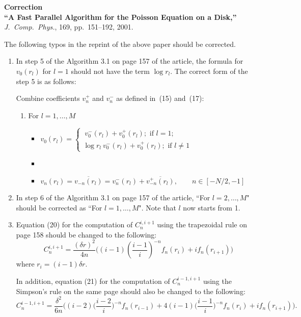 \documentclass[12pt]{article}
\begin{document}
\begin{center}
{\bf Correction}\\
{\bf ``A Fast Parallel Algorithm for the Poisson Equation on a Disk,''}
{\it J.\ Comp.\ Phys.\/}, 169, pp.~151--192, 2001.
\end{center}

The following typos in the reprint of the above paper should be corrected.
\begin{enumerate}
\item
In step 5 of the Algorithm 3.1 on page 157 of the article, the formula for 
$v_0(r_l)$ for $l=1$ should not have the term $\log r_l$. The correct form of the
step 5 is as follows:

Combine coefficients $v_n^{+}$ and $v_n^{-}$ as defined in~(15) and~(17):
   \begin{enumerate}
   \item[] For $l=1,\dots,M$
      \begin{itemize}
      \item[] $v_0(r_l) = \left\{\begin{array}{l}\ v_0^{-}(r_l) +v_0^{+}(r_l); \text{ if } l=1;\\ \log r_l\ v_0^{-}(r_l) +v_0^{+}(r_l); \text{ if } l \ne 1\end{array}\right.$
      \item[]
      \item[] $v_n(r_l) = \overline{v_{-n}(r_l)} = 
              v_n^{-}(r_l) + \overline{v_{-n}^{+}(r_l)},\qquad n\in[-N/2,-1]$
      \end{itemize}
   \end{enumerate}

\item
In step 6 of the Algorithm 3.1 on page 157 of the article, ``For $l=2,\ldots, M$"
should be corrected as ``For $l=1,\ldots, M$". Note that $l$ now starts from 1.

\item Equation (20) for the computation of $C^{i, i+1}_n$ using the trapezoidal rule on page 158 should be changed to the following:
\[ C^{i, i+1}_n = \frac{(\delta r)^2}{4n} \Big( (i-1)\left(\frac{i-1}{i}\right)^{-n}f_n(r_i) + if_n(r_{i+1}) \Big) \]
where $r_i = (i-1)\delta r$. 

In addition, equation (21) for the computation of $C^{i-1,i+1}_n$ using the Simpson's rule on the same page should also be changed to the following:
\[ C^{i-1,i+1}_n = \frac{\delta^2}{6n} \Big( (i-2)\Big(\frac{i-2}{i}\Big)^{-n} f_n(r_{i-1}) + 4(i-1)\Big( \frac{i-1}{i} \Big)^{-n} f_n(r_i) + if_n(r_{i+1}) \Big). \]


\end{enumerate}
\end{document}
